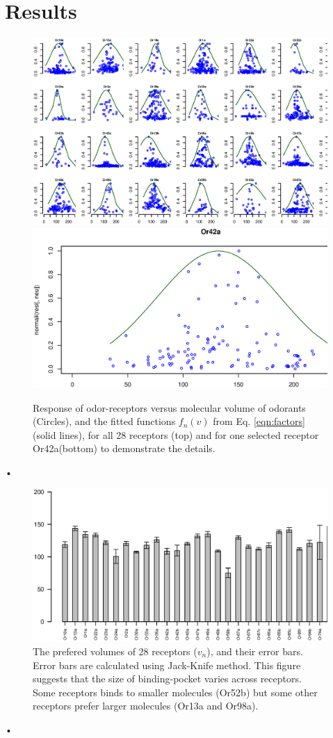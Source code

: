 \documentclass[11pt]{paper} %
\begin{document}
\section{Results}
\begin{figure}
	\centering
	\includegraphics[width=\textwidth]{fig/vol-res}
	\includegraphics[width=0.75 \textwidth]{fig/vol-res-Or42a}
	\caption{Response of odor-receptors  versus molecular volume of odorants (Circles), and the fitted functions $f_n(v)$ from Eq. \ref{eqn:factors} (solid lines), 
	for all 28 receptors (top) and for one selected receptor Or42a(bottom) to demonstrate the details. }
	\label{fig:vol-res}
\end{figure}•

\begin{figure}
	\includegraphics[width=\textwidth]{fig/mean-vol}
	\caption{The prefered volumes of 28 receptors ($v_n$), and their error bars. Error bars are calculated using Jack-Knife method. 
	This figure suggests that the size of binding-pocket varies across receptors. 
	Some receptors binds to smaller molecules (Or52b) but some other receptors prefer larger molecules (Or13a and Or98a).}
	\label{fig:preferred_volume}
\end{figure}•
\end{document}
